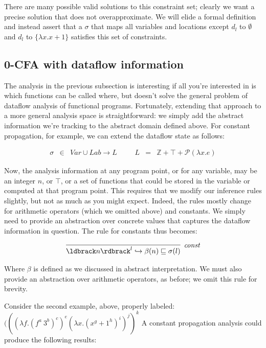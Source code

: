 \documentclass[11pt]{article}
\def\Integer{\mathbb{Z}}
\newcommand{\parg}[1] %
  {\ldbrack #1 \rdbrack}
\newcommand{\alap}{\sqsubseteq}
\begin{document}
There are many possible valid solutions to this constraint set; clearly we want a precise solution that does not overapproximate.  We will elide a formal definition and instead assert that a $\sigma$ that maps all variables and locations except $d_l$ to $\emptyset$ and $d_l$ to $\{ \lambda x . x + 1 \}$ satisfies this set of constraints. 


\subsection{0-CFA with dataflow information}

The analysis in the previous subsection is interesting if all you're interested in is which functions can be called where, but doesn't solve the general problem of dataflow analysis of functional programs.  Fortunately, extending that approach to a more general analysis space is straightforward: we simply add the abstract information we're tracking to the abstract domain defined above.  For constant propagation, for example, we can extend the dataflow state as follows:

\[
\begin{array}{lllllll}
\sigma & \in & \textit{Var} \cup \textit{Lab} \rightarrow L & ~~~~ & L & = & \Integer + \top + \mathcal{P}(\lambda x . e)
\end{array}
\]

Now, the analysis information at any  program point, or for any variable, may be an integer $n$, or $\top$, or a set of functions that could be stored in the variable or computed at that program point.  
This requires that we modify our inference rules slightly, but not as much as you might expect. Indeed, the rules mostly change for arithmetic operators (which we omitted above) and constants.  We simply need to provide an abstraction over concrete values that captures the dataflow information in question.  The rule for constants thus becomes: 


\[
\begin{array}{c}
\infer[\textit{const}]
	{\parg{n}^l \hookrightarrow \beta(n) \alap \sigma(l)}
	{}\\
\end{array}
	\]
	
\noindent Where $\beta$ is defined as we discussed in abstract interpretation.  We must also provide an abstraction over arithmetic operators, as before; we omit this rule for brevity.  

Consider the second example, above, properly labeled: $(((\lambda f . (f^a ~ 3^b)^c)^e (\lambda x . (x^g + 1^h)^i)^j)^k$ A constant propagation analysis could produce the following results:
\end{document}
